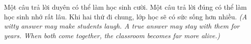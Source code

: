 \begin{baihoc}
Một câu trả lời duyên có thể làm học sinh cười. Một câu trả lời đúng có thể làm học sinh nhớ rất lâu. Khi hai thứ đi chung, lớp học sẽ có sức sống hơn nhiều.
\textit{(A witty answer may make students laugh. A true answer may stay with them for years. When both come together, the classroom becomes far more alive.)}
\end{baihoc}

\ngancach